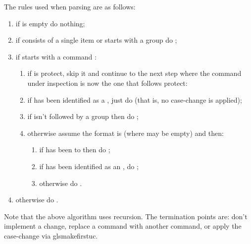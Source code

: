 \documentclass[titlepage=false,oneside,
 fontsize=12pt,captions=tableheading]{scrbook}
\begin{document}
The rules used when parsing  are as follows:
\begin{enumerate}
\item if  is empty do nothing;

\item if  consists of a single item or starts
with a group do ;

\item if  starts with a command :

  \begin{enumerate}
  \item if  is \gls{protect}, skip it and continue to 
  the next step where the command  under inspection 
  is now the one that follows \gls{protect}:

  \item if  has been identified as a , just do
   (that is, no case-change is applied);

  \item if  isn't followed by a group then do
  ;

  \item otherwise assume the format is 
  (where  may be empty) and then:

    \begin{enumerate}
    \item if  has been  to
     then do ;

    \item if  has been identified as an , 
    do ;

    \item otherwise do .
    \end{enumerate}

  \end{enumerate}

\item otherwise do .
\end{enumerate}

Note that the above algorithm uses recursion. The termination points
are: don't implement a change, replace a command with another
command, or apply the case-change via \gls{glsmakefirstuc}.
\end{document}
